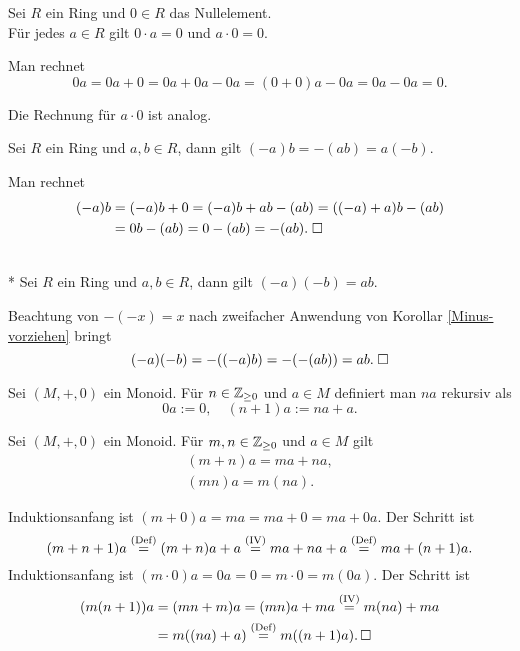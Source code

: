 \begin{Korollar}
Sei $R$ ein Ring und $0\in R$ das Nullelement.\\
Für jedes $a\in R$ gilt $0\cdot a = 0$ und $a\cdot 0 = 0$.
\end{Korollar}
\begin{Beweis} Man rechnet
\[0a = 0a+0 = 0a+0a-0a = (0+0)a-0a = 0a-0a = 0.\]
\end{Beweis}
Die Rechnung für $a\cdot 0$ ist analog.\;\qedsymbol

\begin{Korollar}\label{Minus-vorziehen}
Sei $R$ ein Ring und $a,b\in R$, dann gilt $(-a)b = -(ab) = a(-b)$.
\end{Korollar}
\begin{Beweis}
Man rechnet
\begin{align*}
(-a)b &= (-a)b+0 = (-a)b+ab-(ab) = ((-a)+a)b-(ab)\\
&= 0b-(ab) = 0-(ab) = -(ab).\;\square
\end{align*}
\end{Beweis}

\begin{Korollar}\mbox{}\\*
Sei $R$ ein Ring und $a,b\in R$, dann gilt
$(-a)(-b) = ab$.
\end{Korollar}
Beachtung von $-(-x)=x$ nach zweifacher Anwendung von
Korollar \ref{Minus-vorziehen} bringt
\[(-a)(-b) = -((-a)b) = -(-(ab)) = ab.\;\square\]

\begin{Definition}
Sei $(M,+,0)$ ein Monoid. Für $n\in\mathbb Z_{\ge 0}$ und $a\in M$ definiert
man $na$ rekursiv als
\[0a := 0,\quad (n+1)a := na + a.\]
\end{Definition}

\begin{Korollar}
Sei $(M,+,0)$ ein Monoid. Für $m,n\in\mathbb Z_{\ge 0}$ und $a\in M$ gilt
\begin{gather}
(m+n)a = ma + na,\\
(mn)a = m(na).
\end{gather}
\end{Korollar}
\begin{Beweis}
Induktionsanfang ist $(m+0)a = ma = ma+0 = ma + 0a$. Der Schritt ist%
\[(m+n+1)a \stackrel{\mathrm{(Def)}}{=} (m+n)a + a
\stackrel{\mathrm{(IV)}}{=} ma+na + a
\stackrel{\mathrm{(Def)}}{=} ma + (n+1)a.\]
Induktionsanfang ist $(m\cdot 0)a = 0a = 0 = m\cdot 0 = m(0a)$.
Der Schritt ist
\begin{align*}
(m(n+1))a &= (mn+m)a = (mn)a+ma \stackrel{\mathrm{(IV)}}{=} m(na)+ma\\
&= m((na)+a) \stackrel{\mathrm{(Def)}}{=}
m((n+1)a).\,\square
\end{align*}
\end{Beweis}

